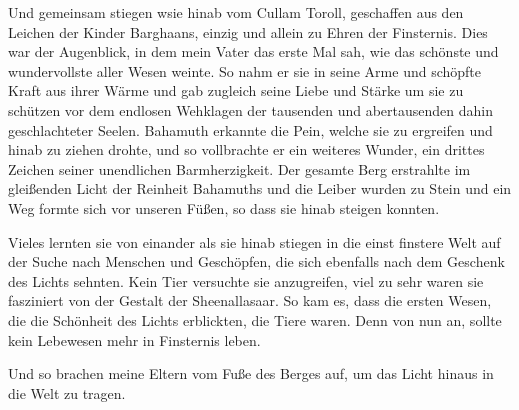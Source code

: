 \documentclass[14pt,twoside,BCOR=12mm,DIV=classic]{scrbook}
\begin{document}
Und gemeinsam stiegen wsie hinab vom Cullam Toroll, geschaffen aus den Leichen
der Kinder Barghaans, einzig und allein zu Ehren der Finsternis. Dies war der
Augenblick, in dem mein Vater das erste Mal sah, wie das schönste und
wundervollste aller Wesen weinte. So nahm er sie in seine Arme und schöpfte
Kraft aus ihrer Wärme und gab zugleich seine Liebe und Stärke um sie zu schützen
vor dem endlosen Wehklagen der tausenden und abertausenden dahin geschlachteter
Seelen.
Bahamuth erkannte die Pein, welche sie zu ergreifen und hinab zu ziehen drohte,
und so vollbrachte er ein weiteres Wunder, ein drittes Zeichen seiner
unendlichen Barmherzigkeit. Der gesamte Berg erstrahlte im gleißenden Licht der
Reinheit Bahamuths und die Leiber wurden zu Stein und ein Weg formte sich vor
unseren Füßen, so dass sie hinab steigen konnten.

Vieles lernten sie von einander als sie hinab stiegen in die einst finstere Welt
auf der Suche nach Menschen und Geschöpfen, die sich ebenfalls nach dem Geschenk
des Lichts sehnten. Kein Tier versuchte sie anzugreifen, viel zu sehr waren sie
fasziniert von der Gestalt der Sheenallasaar. So kam es, dass die ersten Wesen,
die die Schönheit des Lichts erblickten, die Tiere waren. Denn von nun an,
sollte kein Lebewesen mehr in Finsternis leben.

Und so brachen meine Eltern vom Fuße des Berges auf, um das Licht hinaus in die
Welt zu tragen.
\end{document}

